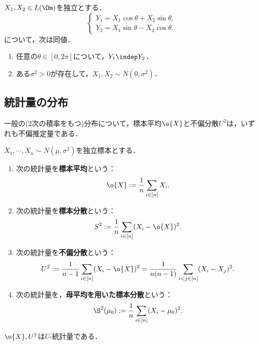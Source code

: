 \documentclass[uplatex,dvipdfmx]{jsreport}
\begin{document}
\begin{theorem}[Kac (40)]
    $X_1,X_2\in L(\Om)$を独立とする．
    \[\begin{cases}
        Y_1=X_1\cos\theta+X_2\sin\theta,\\
        Y_2=X_1\sin\theta-X_2\cos\theta.
    \end{cases}\]
    について，次は同値．
    \begin{enumerate}
        \item 任意の$\theta\in[0,2\pi]$について，$Y_1\indep Y_2$．
        \item ある$\sigma^2>0$が存在して，$X_1,X_2\sim N(0,\sigma^2)$．
    \end{enumerate}
\end{theorem}

\subsection{統計量の分布}

\begin{tcolorbox}[colframe=ForestGreen, colback=ForestGreen!10!white,breakable,colbacktitle=ForestGreen!40!white,coltitle=black,fonttitle=\bfseries\sffamily,
title=]
    一般の(2次の積率をもつ)分布について，標本平均$\o{X}$と不偏分散$U^2$は，いずれも不偏推定量である．
\end{tcolorbox}

\begin{definition}
    $X_1,\cdots,X_n\sim N(\mu,\sigma^2)$を独立標本とする．
    \begin{enumerate}
        \item 次の統計量を\textbf{標本平均}という：
        \[\o{X}:=\frac{1}{n}\sum_{i\in[n]}X_i.\]
        \item 次の統計量を\textbf{標本分散}という：
        \[S^2:=\frac{1}{n}\sum_{i\in[n]}(X_i-\o{X})^2.\]
        \item 次の統計量を\textbf{不偏分散}という：
        \[U^2:=\frac{1}{n-1}\sum_{i\in[n]}(X_i-\o{X})^2=\frac{1}{n(n-1)}\sum_{i<j\in[n]}(X_i-X_j)^2.\]
        \item 次の統計量を，\textbf{母平均を用いた標本分散}という：
        \[\S^2(\mu_0):=\frac{1}{n}\sum_{i\in[n]}(X_i-\mu_0)^2.\]
    \end{enumerate}
    $\o{X},U^2$は$U$-統計量である．
\end{definition}
\end{document}

